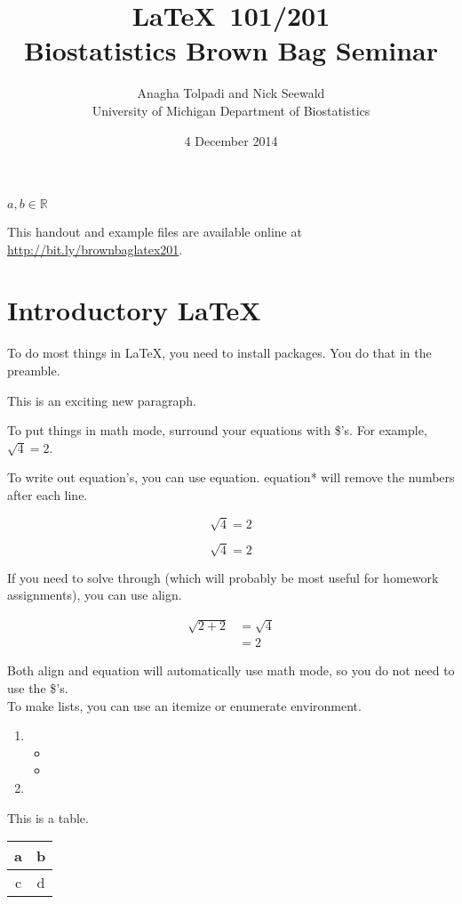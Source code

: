 \documentclass{article}
\title{\LaTeX \ 101/201 \\
	\Large{Biostatistics Brown Bag Seminar}}
\author{Anagha Tolpadi and Nick Seewald \\ \small{University of Michigan Department of Biostatistics}}
\date{4 December 2014}
\begin{document}
	\maketitle
	
	$a,b\in \mathbb{R}$
	
	This handout and example files are available online at \href{http://bit.ly/brownbaglatex201}{http://bit.ly/brownbaglatex201}.
	
	\section{Introductory \LaTeX}
	To do most things in \LaTeX, you need to install packages. You do that in the preamble.
	
	This is an exciting new paragraph.
	
	To put things in math mode, surround your equations with \$'s. For example, $\sqrt{4}=2$.
	
	To write out equation's, you can use  equation. equation* will remove the numbers after each line.
	
	\begin{equation}
	\sqrt{4} = 2
	\end{equation}
	
	\begin{equation*}
	\sqrt{4} = 2
	\end{equation*}
	
	If you need to solve through (which will probably be most useful for homework assignments), you can use align.
	
	\begin{align*}
	\sqrt{2+2} &= \sqrt{4} \\
	&= 2
	\end{align*}
	
	Both align and equation will automatically use math mode, so you do not need to use the \$'s.
	\\
	To make lists, you can use an itemize or enumerate environment.
	\begin{enumerate}
		\item
		\begin{itemize}
			\item
			\item
			\end{itemize}
			\item
	\end{enumerate}
			
			This is a table.
			\begin{center}
				\begin{tabular}{c|c|}
					\hline
					a & b \\
					\hline
					c & d \\
					\hline
				\end{tabular}
			\end{center}
	
\end{document}
